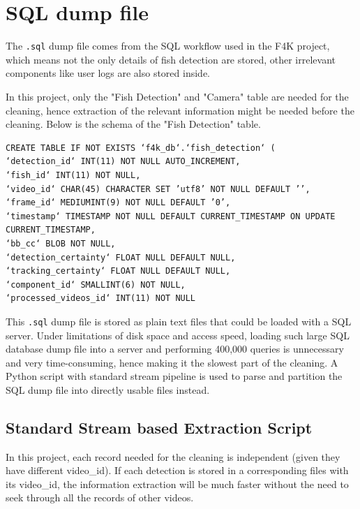 \documentclass[bsc,logo,twoside,fullspacing,parskip]{infthesis}
\begin{document}
\section{SQL dump file}
\label{sec:sqld}

The {\tt .sql} dump file comes from the SQL workflow used in the F4K project, which means not the only details of fish detection are stored, other irrelevant components like user logs are also stored inside. 

In this project, only the "Fish Detection" and "Camera" table are needed for the cleaning, hence extraction of the relevant information might be needed before the cleaning.
Below is the schema of the "Fish Detection" table. 

\lstset{basicstyle=\tiny\ttfamily,breaklines=true,style=sql}
\begin{lstlisting}[frame=single]
CREATE TABLE IF NOT EXISTS ‘f4k_db‘.‘fish_detection‘ (
‘detection_id‘ INT(11) NOT NULL AUTO_INCREMENT,
‘fish_id‘ INT(11) NOT NULL,
‘video_id‘ CHAR(45) CHARACTER SET ’utf8’ NOT NULL DEFAULT ’’,
‘frame_id‘ MEDIUMINT(9) NOT NULL DEFAULT ’0’,
‘timestamp‘ TIMESTAMP NOT NULL DEFAULT CURRENT_TIMESTAMP ON UPDATE CURRENT_TIMESTAMP,
‘bb_cc‘ BLOB NOT NULL,
‘detection_certainty‘ FLOAT NULL DEFAULT NULL,
‘tracking_certainty‘ FLOAT NULL DEFAULT NULL,
‘component_id‘ SMALLINT(6) NOT NULL,
‘processed_videos_id‘ INT(11) NOT NULL
\end{lstlisting}

This {\tt .sql} dump file is stored as plain text files that could be loaded with a SQL server.
Under limitations of disk space and access speed, loading such large SQL database dump file into a server and performing 400,000 queries is unnecessary and very time-consuming, hence making it the slowest part of the cleaning. 
A Python script with standard stream pipeline is used to parse and partition the SQL dump file into directly usable files instead.

\subsection{Standard Stream based Extraction Script}

In this project, each record needed for the cleaning is independent (given they have different video\_id). 
If each detection is stored in a corresponding files with its video\_id, the information extraction will be much faster without the need to seek through all the records of other videos.
\end{document}
